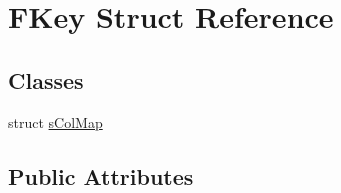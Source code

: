 \hypertarget{struct_f_key}{\section{F\-Key Struct Reference}
\label{struct_f_key}
}
\subsection*{Classes}
\begin{DoxyCompactItemize}
\item 
struct \hyperlink{struct_f_key_1_1s_col_map}{s\-Col\-Map}
\end{DoxyCompactItemize}
\subsection*{Public Attributes}
